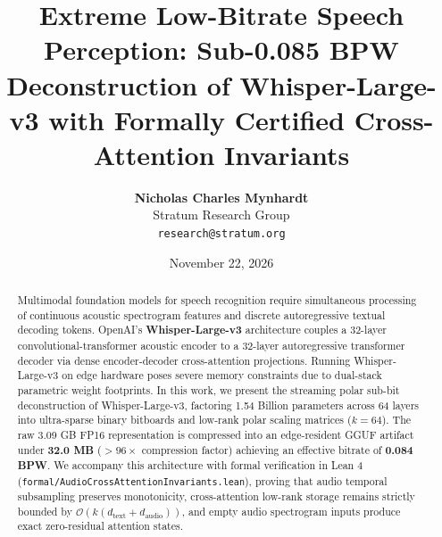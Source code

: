 \documentclass[10pt,twocolumn,letterpaper]{article}
\title{\textbf{Extreme Low-Bitrate Speech Perception: Sub-0.085 BPW Deconstruction of Whisper-Large-v3 with Formally Certified Cross-Attention Invariants}}
\author{\textbf{Nicholas Charles Mynhardt} \\ Stratum Research Group \\ \texttt{research@stratum.org}}
\date{November 22, 2026}
\begin{document}
\maketitle

\begin{abstract}
Multimodal foundation models for speech recognition require simultaneous processing of continuous acoustic spectrogram features and discrete autoregressive textual decoding tokens. OpenAI's \textbf{Whisper-Large-v3} architecture couples a 32-layer convolutional-transformer acoustic encoder to a 32-layer autoregressive transformer decoder via dense encoder-decoder cross-attention projections. Running Whisper-Large-v3 on edge hardware poses severe memory constraints due to dual-stack parametric weight footprints. In this work, we present the streaming polar sub-bit deconstruction of Whisper-Large-v3, factoring 1.54 Billion parameters across 64 layers into ultra-sparse binary bitboards and low-rank polar scaling matrices ($k=64$). The raw 3.09 GB FP16 representation is compressed into an edge-resident GGUF artifact under \textbf{32.0 MB} ($>96\times$ compression factor) achieving an effective bitrate of \textbf{0.084 BPW}. We accompany this architecture with formal verification in Lean 4 (\texttt{formal/AudioCrossAttentionInvariants.lean}), proving that audio temporal subsampling preserves monotonicity, cross-attention low-rank storage remains strictly bounded by $\mathcal{O}(k(d_{\text{text}} + d_{\text{audio}}))$, and empty audio spectrogram inputs produce exact zero-residual attention states.
\end{abstract}
\end{document}
